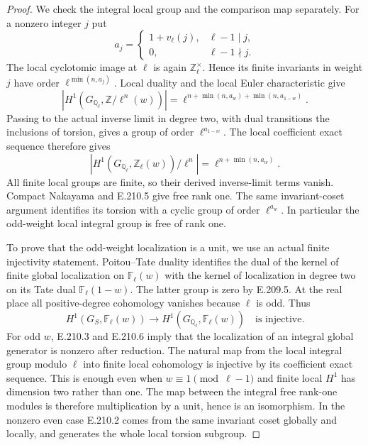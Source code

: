 \begin{proof}
We check the integral local group and the comparison
map separately. For a nonzero integer $j$ put
\[
 a_j=\begin{cases}1+v_\ell(j),&\ell-1\mid j,\\0,&\ell-1\nmid j.
 \end{cases}
\]
The local cyclotomic image at $\ell$ is again
$\mathbb Z_\ell^\times$. Hence its finite invariants
in weight $j$ have order $\ell^{\min(n,a_j)}$.
Local duality and the local Euler characteristic
\citep[I.2.3 and I.2.8, pp.~28,31]{CohMilneADT} give
\[
 |H^1(G_{\mathbb Q_\ell},\mathbb Z/\ell^n(w))|
   =\ell^{n+\min(n,a_w)+\min(n,a_{1-w})}.
\]
Passing to the actual inverse limit in degree two,
with dual transitions the inclusions of torsion,
gives a group of order $\ell^{a_{1-w}}$. The local
coefficient exact sequence therefore gives
\[
 |H^1(G_{\mathbb Q_\ell},\mathbb Z_\ell(w))/\ell^n|
                  =\ell^{n+\min(n,a_w)}.                       \tag{E.210.5}
\]
All finite local groups are finite, so their derived
inverse-limit terms vanish. Compact Nakayama and
E.210.5 give free rank one. The same invariant-coset
argument identifies its torsion with a cyclic group
of order $\ell^{a_w}$. In particular the odd-weight
local integral group is free of rank one.

To prove that the odd-weight localization is a unit,
we use an actual finite injectivity statement.
Poitou--Tate duality
\citep[I.4.10(a), pp.~56--57]{CohMilneADT} identifies
the dual of the kernel of finite global localization
on $\mathbb F_\ell(w)$ with the kernel of localization
in degree two on its Tate dual
$\mathbb F_\ell(1-w)$. The latter group is zero by
E.209.5. At the real place all positive-degree
cohomology vanishes because $\ell$ is odd.
Thus
\[
 H^1(G_S,\mathbb F_\ell(w))
 \longrightarrow H^1(G_{\mathbb Q_\ell},\mathbb F_\ell(w))
 \quad\text{is injective}.                                    \tag{E.210.6}
\]
For odd $w$, E.210.3 and E.210.6 imply that the
localization of an integral global generator is
nonzero after reduction. The natural map from the
local integral group modulo $\ell$ into finite local
cohomology is injective by its coefficient exact
sequence. This is enough even when $w\equiv1\pmod{\ell-1}$
and finite local $H^1$ has dimension two rather than one.
The map between the integral free rank-one modules
is therefore multiplication by a unit, hence is an
isomorphism. In the nonzero even case E.210.2 comes
from the same invariant coset globally and locally,
and generates the whole local torsion subgroup.


\end{proof}
